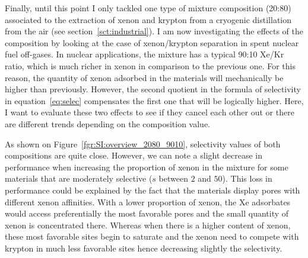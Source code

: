 \documentclass[main.tex]{subfiles}
\begin{document}
Finally, until this point I only tackled one type of mixture composition (20:80) associated to the extraction of xenon and krypton from a cryogenic distillation from the air (see section~\ref{sct:industrial}). I am now investigating the effects of the composition by looking at the case of xenon/krypton separation in spent nuclear fuel off-gases. In nuclear applications, the mixture has a typical 90:10 Xe/Kr ratio, which is much richer in xenon in comparison to the previous one. For this reason, the quantity of xenon adsorbed in the materials will mechanically be higher than previously. However, the second quotient in the formula of selectivity in equation~\ref{eq:selec} compensates the first one that will be logically higher. Here, I want to evaluate these two effects to see if they cancel each other out or there are different trends depending on the composition value. 

As shown on Figure~\ref{fgr:SI:overview_2080_9010}, selectivity values of both compositions are quite close. However, we can note a slight decrease in performance when increasing the proportion of xenon in the mixture for some materials that are moderately selective ($s$ between $2$ and $50$). This loss in performance could be explained by the fact that the materials display pores with different xenon affinities. With a lower proportion of xenon, the Xe adsorbates would access preferentially the most favorable pores and the small quantity of xenon is concentrated there. Whereas when there is a higher content of xenon, these most favorable sites begin to saturate and the xenon need to compete with krypton in much less favorable sites hence decreasing slightly the selectivity.
\end{document}
